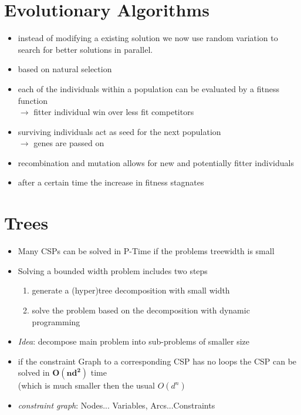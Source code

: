\documentclass[12pt,a4paper]{article}
\begin{document}
\section{Evolutionary Algorithms}
\begin{itemize}
\item instead of modifying a existing solution we now use random variation to search for better solutions in parallel.
\item based on natural selection
\item each of the individuals within a population can be evaluated by a fitness function\\
$\rightarrow$ fitter individual win over less fit competitors
\item surviving individuals act as seed for the next population\\
$\rightarrow$ genes are passed on
\item recombination and mutation allows for new and potentially fitter individuals
\item after a certain time the increase in fitness stagnates 
\end{itemize}

\section{Trees}
\begin{itemize}
\item Many CSPs can be solved in P-Time if the problems treewidth is small
\item  Solving a bounded width problem includes two steps
\begin{enumerate}
\item generate a (hyper)tree decomposition with small width
\item solve the problem based on the decomposition with dynamic programming
\end{enumerate}
\item \textit{Idea}: decompose main problem into sub-problems of smaller size
\item if the constraint Graph to a corresponding CSP has no loops the CSP can be solved in $\mathbf{O(nd^2)}$ time\\
(which is much smaller then the usual $O(d^n)$
\item \textit{constraint graph}: Nodes... Variables, Arcs...Constraints
\end{itemize}
\end{document}
